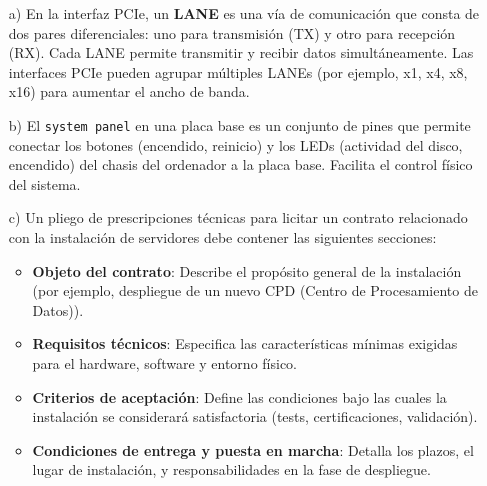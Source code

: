 \documentclass[a4paper,12pt]{article}
\begin{document}
        \begin{enumerate}
            \item[a)] En la interfaz PCIe, un \textbf{LANE} es una vía de comunicación que consta de dos pares diferenciales: uno para transmisión (TX) y otro para recepción (RX). Cada LANE permite transmitir y recibir datos simultáneamente. Las interfaces PCIe pueden agrupar múltiples LANEs (por ejemplo, x1, x4, x8, x16) para aumentar el ancho de banda.
        
            \item[b)] El \texttt{system panel} en una placa base es un conjunto de pines que permite conectar los botones (encendido, reinicio) y los LEDs (actividad del disco, encendido) del chasis del ordenador a la placa base. Facilita el control físico del sistema.
        
            \item[c)] Un pliego de prescripciones técnicas para licitar un contrato relacionado con la instalación de servidores debe contener las siguientes secciones:
            \begin{itemize}
                \item \textbf{Objeto del contrato}: Describe el propósito general de la instalación (por ejemplo, despliegue de un nuevo CPD (Centro de Procesamiento de Datos)).
                \item \textbf{Requisitos técnicos}: Especifica las características mínimas exigidas para el hardware, software y entorno físico.
                \item \textbf{Criterios de aceptación}: Define las condiciones bajo las cuales la instalación se considerará satisfactoria (tests, certificaciones, validación).
                \item \textbf{Condiciones de entrega y puesta en marcha}: Detalla los plazos, el lugar de instalación, y responsabilidades en la fase de despliegue.
            \end{itemize}
        \end{enumerate}
        
        
        

    
    
\end{document}
